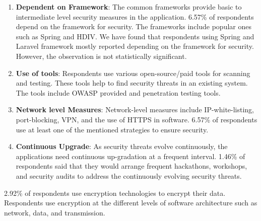 \begin{enumerate}[label=(\alph*)]
  \item \textbf{Dependent on Framework}: The common frameworks provide basic to intermediate level security measures in the application. 6.57\% of respondents depend on the framework for security. The frameworks include popular ones such as Spring and HDIV. We have found that respondents using Spring and Laravel framework mostly reported depending on the framework for security. However, the observation is not statistically significant.
  
  \item \textbf{Use of tools}: Respondents use various open-source/paid tools for scanning and testing. These tools help to find security threats in an existing system. The tools include OWASP provided and penetration testing tools.
  
  \item \textbf{Network level Measures}: Network-level measures include IP-white-listing, port-blocking, VPN, and the use of HTTPS in software. 6.57\% of respondents use at least one of the mentioned strategies to ensure security.

  \item \textbf{Continuous Upgrade}: As security threats evolve continuously, the applications need continuous up-gradation at a frequent interval. 1.46\% of respondents said that they would arrange frequent hackathons, workshops, and security audits to address the continuously evolving security threats.
\end{enumerate}

2.92\% of respondents use encryption technologies to encrypt their data. Respondents use encryption at the different levels of software architecture such as network, data, and transmission.



